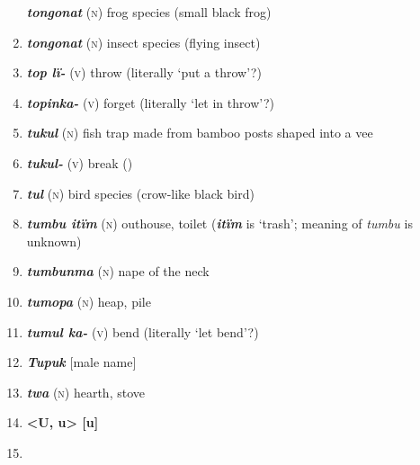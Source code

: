 \begin{enumerate}[noitemsep, label={}, align=left, widest=190, labelsep=1ex,leftmargin=*,itemindent=-10pt]
\textbf{\textit{tongonat}} (\textsc{n}) frog species (small black frog) \item 
\textbf{\textit{tongonat}} (\textsc{n}) insect species (flying insect) \item 
\textbf{\textit{top lï-}} (\textsc{v}) throw (literally ‘put a throw’?) \item 
\textbf{\textit{topinka-}} (\textsc{v}) forget (literally ‘let in throw’?) \item 
\textbf{\textit{tukul}} (\textsc{n}) fish trap made from bamboo posts shaped into a vee \item 
\textbf{\textit{tukul-}} (\textsc{v}) break () \item 
\textbf{\textit{tul}} (\textsc{n}) bird species (crow-like black bird) \item 
\textbf{\textit{tumbu itïm}} (\textsc{n}) outhouse, toilet (\textbf{\textit{itïm}} is ‘trash’; meaning of \textit{tumbu} is unknown) \item 
\textbf{\textit{tumbunma}} (\textsc{n}) nape of the neck \item 
\textbf{\textit{tumopa}} (\textsc{n}) heap, pile \item 
\textbf{\textit{tumul ka-}} (\textsc{v}) bend (literally ‘let bend’?) \item 
\textbf{\textit{Tupuk}} [male name] \item 
\textbf{\textit{twa}} (\textsc{n}) hearth, stove\\ \item 

\noindent \textbf{<U, u>        [u]}\\ \item 


\end{enumerate}
